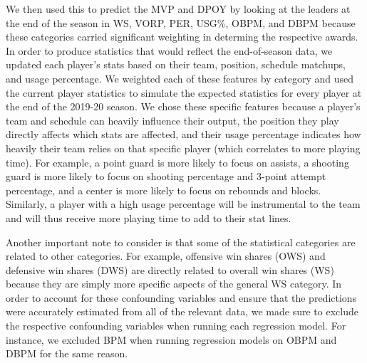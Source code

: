 \documentclass[]{article}
\begin{document}
We then used this to predict the MVP and DPOY by looking at the leaders
at the end of the season in WS, VORP, PER, USG\%, OBPM, and DBPM because
these categories carried significant weighting in determing the
respective awards. In order to produce statistics that would reflect the
end-of-season data, we updated each player's stats based on their team,
position, schedule matchups, and usage percentage. We weighted each of
these features by category and used the current player statistics to
simulate the expected statistics for every player at the end of the
2019-20 season. We chose these specific features because a player's team
and schedule can heavily influence their output, the position they play
directly affects which stats are affected, and their usage percentage
indicates how heavily their team relies on that specific player (which
correlates to more playing time). For example, a point guard is more
likely to focus on assists, a shooting guard is more likely to focus on
shooting percentage and 3-point attempt percentage, and a center is more
likely to focus on rebounds and blocks. Similarly, a player with a high
usage percentage will be instrumental to the team and will thus receive
more playing time to add to their stat lines.

Another important note to consider is that some of the statistical
categories are related to other categories. For example, offensive win
shares (OWS) and defensive win shares (DWS) are directly related to
overall win shares (WS) because they are simply more specific aspects of
the general WS category. In order to account for these confounding
variables and ensure that the predictions were accurately estimated from
all of the relevant data, we made sure to exclude the respective
confounding variables when running each regression model. For instance,
we excluded BPM when running regression models on OBPM and DBPM for the
same reason.
\end{document}
